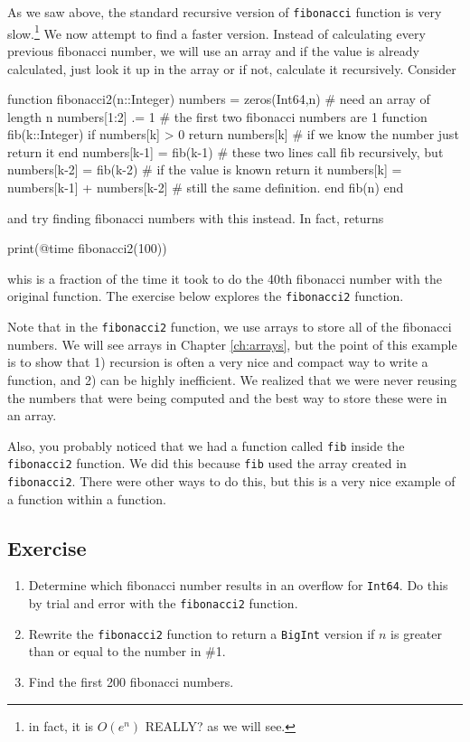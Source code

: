 As we saw above, the standard recursive version of \verb!fibonacci! function is very slow.\footnote{in fact, it is $O(e^n)$ {\color{red} REALLY?} as we will see.}
We now attempt to find a faster version. Instead of calculating every previous fibonacci number, we will use an array and if the value is already calculated, just look it up in the array or if not, calculate it recursively.  Consider
\begin{jlblock}[fibonacci]
function fibonacci2(n::Integer)
  numbers = zeros(Int64,n)  # need an array of length n
  numbers[1:2] .= 1         # the first two fibonacci numbers are 1
  function fib(k::Integer)
    if numbers[k] > 0
      return numbers[k]  # if we know the number just return it
    end
    numbers[k-1] = fib(k-1)  # these two lines call fib recursively, but 
    numbers[k-2] = fib(k-2)  # if the value is known return it
    numbers[k] = numbers[k-1] + numbers[k-2]  # still the same definition.
  end
  fib(n)
end
\end{jlblock}
%
and try finding fibonacci numbers with this instead.  In fact,  returns
\begin{jlcode}[fibonacci]
print(@time fibonacci2(100))
\end{jlcode}
\printpythontex[verbatim]
%
whis is a fraction of the time it took to do the 40th fibonacci number with the original function. The exercise below explores the \verb!fibonacci2! function.   

Note that in the \verb!fibonacci2! function, we use arrays to store all of the fibonacci numbers.  We will see arrays in Chapter \ref{ch:arrays}, but the point of this example is to show that 1) recursion is often a very nice and compact way to write a function, and 2) can be highly inefficient.  We realized that we were never reusing the numbers that were being computed and the best way to store these were in an array. 

Also, you probably noticed that we had a function called \verb!fib! inside the \verb!fibonacci2! function.  We did this because \verb!fib! used the array created in \verb!fibonacci2!.  There were other ways to do this, but this is a very nice example of a function within a function.

\subsection{Exercise}

\begin{enumerate}
\item Determine which fibonacci number results in an overflow for \texttt{Int64}. Do this by trial and error with the \verb!fibonacci2! function.   
\item Rewrite the \verb!fibonacci2! function to return a \verb!BigInt! version if $n$ is greater than or equal to the number in \#1.  
\item Find the first 200 fibonacci numbers. 
\end{enumerate}




